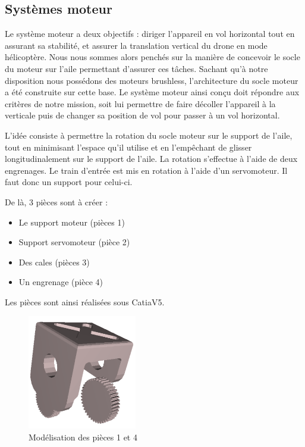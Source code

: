 \documentclass[a4paper,12pt,french]{report}
\begin{document}
\newpage
\subsection{Systèmes moteur}

Le système moteur a deux objectifs : diriger l'appareil en vol horizontal tout en assurant sa stabilité, et assurer la translation vertical du drone en mode hélicoptère. Nous nous sommes alors penchés sur la manière de concevoir le socle du moteur sur l’aile permettant d'assurer ces tâches. Sachant qu’à notre disposition nous possédons des moteurs brushless, l’architecture du socle moteur a été construite sur cette base. Le système moteur ainsi conçu doit répondre aux critères de notre mission, soit lui permettre de faire décoller l’appareil à la verticale puis de changer sa position de vol pour passer à un vol horizontal. \newline

L’idée consiste à permettre la rotation du socle moteur sur le support de l’aile, tout en minimisant l’espace qu’il utilise et en l’empêchant de glisser longitudinalement sur le support de l’aile. La rotation s’effectue à l’aide de deux engrenages. Le train d’entrée est mis en rotation à l’aide d’un servomoteur. Il faut donc un support pour celui-ci.\newline

De là, 3 pièces sont à créer :
\begin{itemize}
    \item Le support moteur (pièces 1)
    \item Support servomoteur (pièce 2)
    \item Des cales (pièces 3)
    \item Un engrenage (pièce 4)\newline
\end{itemize}

Les pièces sont ainsi réalisées sous CatiaV5.

\begin{figure}[h]
    \centering
    \includegraphics[height=5cm]{figures/mot1.png}
    \caption{Modélisation des pièces 1 et 4}
\end{figure}
\end{document}
